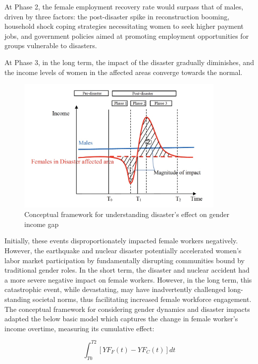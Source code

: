 \documentclass[a4paper,12pt]{article}
\begin{document}
At Phase 2, the female employment recovery rate would surpass that of males, driven by three factors: the post-disaster spike in reconstruction booming, household shock coping strategies necessitating women to seek higher payment jobs, and government policies aimed at promoting employment opportunities for groups vulnerable to disasters.

At Phase 3, in the long term, the impact of the disaster gradually diminishes, and the income levels of women in the affected areas converge towards the normal.


\begin{figure}[h!]
    \centering
    \includegraphics[width=0.9\textwidth]{Final_conceptual_model.jpeg}  %
    \caption{Conceptual framework for understanding disaster's effect on gender income gap}
    \label{fig:conceptual_model}
\end{figure}


Initially, these events disproportionately impacted female workers negatively. However, the earthquake and nuclear disaster potentially accelerated women's labor market participation by fundamentally disrupting communities bound by traditional gender roles. In the short term, the disaster and nuclear accident had a more severe negative impact on female workers. However, in the long term, this catastrophic event, while devastating, may have inadvertently challenged long-standing societal norms, thus facilitating increased female workforce engagement. The conceptual framework for considering gender dynamics and disaster impacts adapted the below basic model which captures the change in female worker's income overtime, measuring its cumulative effect:

\begin{equation}
\int_{T0}^{T2} [YF_F(t) - YF_C(t)] dt
\end{equation}
\end{document}
